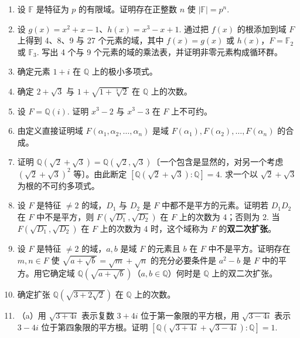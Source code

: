 \begin{enumerate}
\item 设 \(\mathbb{F}\) 是特征为 \(p\) 的有限域。证明存在正整数 \(n\) 使 \(|\mathbb{F}| = p^n\).

\item 设 \(g(x) = x^2+x-1\)、\(h(x) = x^3-x+1\). 通过把 \(f(x)\) 的根添加到域 \(F\) 上得到 4、8、9 与 27 个元素的域，其中 \(f(x) = g(x)\) 或 \(h(x)\)，\(F = \mathbb{F}_2\) 或 \(\mathbb{F}_3\). 写出 4 个与 9 个元素的域的乘法表，并证明非零元素构成循环群。

\item 确定元素 \(1+i\) 在 \(\mathbb{Q}\) 上的极小多项式。

\item 确定 \(2+\sqrt{3}\) 与 \(1+\sqrt{1+\sqrt[3]{2}}\) 在 \(\mathbb{Q}\) 上的次数。

\item 设 \(F = \mathbb{Q}(i)\). 证明 \(x^3-2\) 与 \(x^3-3\) 在 \(F\) 上不可约。

\item 由定义直接证明域 \(F(\alpha_1, \alpha_2, \ldots, \alpha_n)\) 是域 \(F(\alpha_1), F(\alpha_2), \ldots, F(\alpha_n)\) 的合成。

\item 证明 \(\mathbb{Q}(\sqrt{2}+\sqrt{3}) = \mathbb{Q}(\sqrt{2}, \sqrt{3})\)〔一个包含是显然的，对另一个考虑 \((\sqrt{2}+\sqrt{3})^2\) 等〕。由此断定 \([\mathbb{Q}(\sqrt{2}+\sqrt{3}):\mathbb{Q}] = 4\). 求一个以 \(\sqrt{2}+\sqrt{3}\) 为根的不可约多项式。

\item 设 \(F\) 是特征 \(\neq 2\) 的域，\(D_1\) 与 \(D_2\) 是 \(F\) 中都不是平方的元素。证明若 \(D_1D_2\) 在 \(F\) 中不是平方，则 \(F(\sqrt{D_1}, \sqrt{D_2})\) 在 \(F\) 上的次数为 4；否则为 2. 当 \(F(\sqrt{D_1}, \sqrt{D_2})\) 在 \(F\) 上的次数为 4 时，这个域称为 \(F\) 的\textbf{双二次扩张}。

\item 设 \(F\) 是特征 \(\neq 2\) 的域，\(a, b\) 是域 \(F\) 的元素且 \(b\) 在 \(F\) 中不是平方。证明存在 \(m, n \in F\) 使 \(\sqrt{a+\sqrt{b}} = \sqrt{m}+\sqrt{n}\) 的充分必要条件是 \(a^2-b\) 是 \(F\) 中的平方。用它确定域 \(\mathbb{Q}(\sqrt{a+\sqrt{b}})\)（\(a, b \in \mathbb{Q}\)）何时是 \(\mathbb{Q}\) 上的双二次扩张。

\item 确定扩张 \(\mathbb{Q}(\sqrt{3+2\sqrt{2}})\) 在 \(\mathbb{Q}\) 上的次数。

\item （a）用 \(\sqrt{3+4i}\) 表示复数 \(3+4i\) 位于第一象限的平方根，用 \(\sqrt{3-4i}\) 表示 \(3-4i\) 位于第四象限的平方根。证明 \([\mathbb{Q}(\sqrt{3+4i}+\sqrt{3-4i}):\mathbb{Q}] = 1\).


\end{enumerate}
